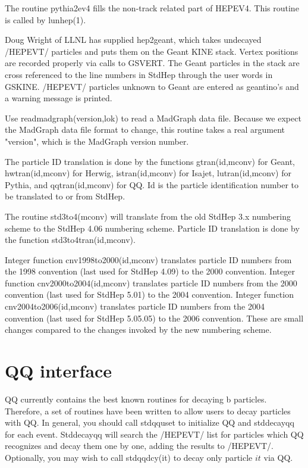 The routine pythia2ev4 fills the non-track related part of HEPEV4.
This routine is called by lunhep(1).

Doug Wright of LLNL has supplied hep2geant, which takes undecayed /HEPEVT/
particles and puts them on the Geant KINE stack.
Vertex positions are recorded properly via calls to GSVERT.
The Geant particles in the stack are cross referenced to the
line numbers in StdHep through the user words in GSKINE.
/HEPEVT/ particles unknown to Geant are entered as geantino's and
a warning message is printed.

Use readmadgraph(version,lok) to read a MadGraph data file.
Because we expect the MadGraph data file format to change, this routine
takes a real argument "version", which is the MadGraph version number.

The particle ID translation is done by the functions gtran(id,mconv) for Geant,
\linebreak
hwtran(id,mconv) for Herwig, istran(id,mconv) for Isajet, lutran(id,mconv)
for Pythia, and qqtran(id,mconv) for QQ.  Id is the particle identification
number to be translated to or from StdHep.

The routine std3to4(mconv) will translate from the old StdHep 3.x
numbering scheme to the StdHep 4.06 numbering scheme.  Particle ID
translation is done by the function std3to4tran(id,mconv).

Integer function cnv1998to2000(id,mconv) translates particle ID numbers from
the 1998 convention (last used for StdHep 4.09) to the 2000 convention\cite{pdg2000}.
Integer function cnv2000to2004(id,mconv) translates particle ID numbers from
the 2000 convention (last used for StdHep 5.01) to the 2004 convention\cite{pdg2004}.
Integer function cnv2004to2006(id,mconv) translates particle ID numbers from
the 2004 convention (last used for StdHep 5.05.05) to the 2006 convention\cite{pdg2006}.
These are small changes compared to the changes invoked by the new
numbering scheme.

\section{QQ interface}

QQ currently contains the best known routines for decaying b particles.
Therefore, a set of routines have been written to allow users to decay
particles with QQ.  In general, you should call stdqquset to initialize
QQ and stddecayqq for each event.  Stddecayqq will search the /HEPEVT/
list for particles which QQ recognizes and decay them one by one, adding
the results to /HEPEVT/.  Optionally, you may wish to call stdqqdcy(it)
to decay only particle $it$ via QQ.

